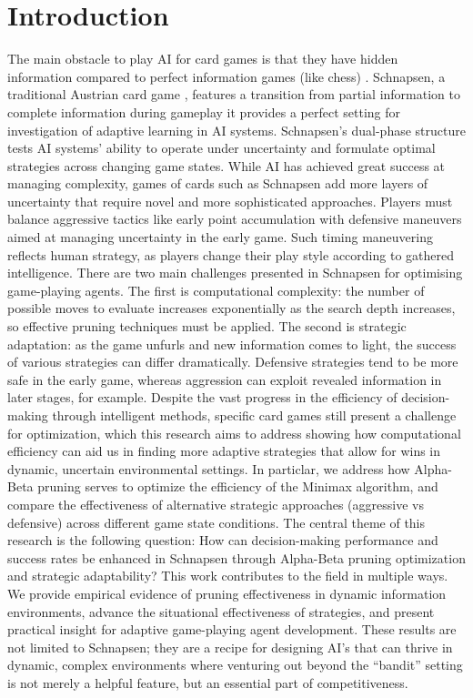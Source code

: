 \documentclass[runningheads]{llncs}
\begin{document}
\section{Introduction}
The main obstacle to play AI for card games is that they have hidden information compared to perfect information games (like chess) \cite{ref_imperfect_games}. Schnapsen, a traditional Austrian card game \cite{ref_pagat}, features a transition from partial information to complete information during gameplay it provides a perfect setting for investigation of adaptive learning in AI systems. Schnapsen's dual-phase structure tests AI systems' ability to operate under uncertainty and formulate optimal strategies across changing game states.
While AI has achieved great success at managing complexity, games of cards such as Schnapsen add more layers of uncertainty that require novel and more sophisticated approaches. Players must balance aggressive tactics like early point accumulation with defensive maneuvers aimed at managing uncertainty in the early game. Such timing maneuvering reflects human strategy, as players change their play style according to gathered intelligence.
There are two main challenges presented in Schnapsen for optimising game-playing agents. The first is computational complexity: the number of possible moves to evaluate increases exponentially as the search depth increases, so effective pruning techniques must be applied. The second is strategic adaptation: as the game unfurls and new information comes to light, the success of various strategies can differ dramatically. Defensive strategies tend to be more safe in the early game, whereas aggression can exploit revealed information in later stages, for example.
Despite the vast progress in the efficiency of decision-making through intelligent methods, specific card games still present a challenge for optimization, which this research aims to address showing how computational efficiency can aid us in finding more adaptive strategies that allow for wins in dynamic, uncertain environmental settings. In particlar, we address how Alpha-Beta pruning serves to optimize the efficiency of the Minimax algorithm, and compare the effectiveness of alternative strategic approaches (aggressive vs defensive) across different game state conditions. The central theme of this research is the following question: How can decision-making performance and success rates be enhanced in Schnapsen through Alpha-Beta pruning optimization and strategic adaptability? This work contributes to the field in multiple ways. We provide empirical evidence of pruning effectiveness in dynamic information environments, advance the situational effectiveness of strategies, and present practical insight for adaptive game-playing agent development. These results are not limited to Schnapsen; they are a recipe for designing AI's that can thrive in dynamic, complex environments where venturing out beyond the “bandit” setting is not merely a helpful feature, but an essential part of competitiveness.
\end{document}
